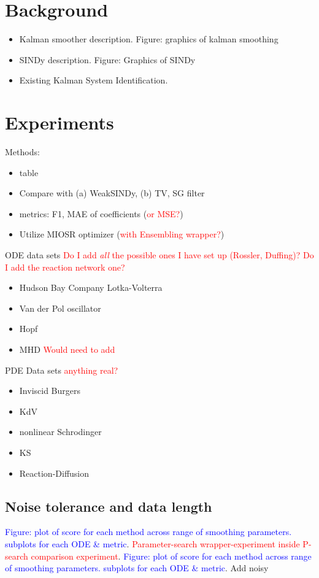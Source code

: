 \documentclass{article}
\begin{document}
\section{Background}
\begin{itemize}
    \item Kalman smoother description.  Figure: graphics of kalman smoothing
    \item SINDy description.  Figure: Graphics of SINDy
    \item Existing Kalman System Identification.
\end{itemize}
\section{Experiments}
Methods:
\begin{itemize}
    \item table
    \item Compare with (a) WeakSINDy, (b) TV, SG filter
    \item metrics: F1, MAE of coefficients (\textcolor{red}{or MSE?})
    \item Utilize MIOSR optimizer (\textcolor{red}{with Ensembling wrapper?})
\end{itemize}
ODE data sets \textcolor{red}{Do I add {\it all} the possible ones I have set up (Rossler, Duffing)?  Do I add the reaction network one?}
\begin{itemize}
    \item Hudson Bay Company Lotka-Volterra
    \item Van der Pol oscillator
    \item Hopf
    \item MHD \textcolor{red}{Would need to add}
\end{itemize}
PDE Data sets \textcolor{red}{anything real?}
\begin{itemize}
    \item Inviscid Burgers
    \item KdV
    \item nonlinear Schrodinger
    \item KS
    \item Reaction-Diffusion
\end{itemize}

\subsection{Noise tolerance and data length}
\textcolor{blue}{Figure: plot of score for each method across range of smoothing parameters.  subplots for each ODE \& metric}.  \textcolor{red}{Parameter-search wrapper-experiment inside P-search comparison experiment}.
\textcolor{blue}{Figure: plot of score for each method across range of smoothing parameters.  subplots for each ODE \& metric}. 
Add noisy 
\end{document}
